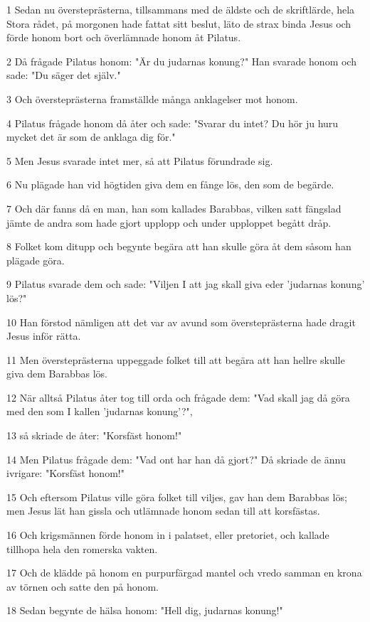 \par 1 Sedan nu översteprästerna, tillsammans med de äldste och de skriftlärde, hela Stora rådet, på morgonen hade fattat sitt beslut, läto de strax binda Jesus och förde honom bort och överlämnade honom åt Pilatus.
\par 2 Då frågade Pilatus honom: "Är du judarnas konung?" Han svarade honom och sade: "Du säger det själv."
\par 3 Och översteprästerna framställde många anklagelser mot honom.
\par 4 Pilatus frågade honom då åter och sade: "Svarar du intet? Du hör ju huru mycket det är som de anklaga dig för."
\par 5 Men Jesus svarade intet mer, så att Pilatus förundrade sig.
\par 6 Nu plägade han vid högtiden giva dem en fånge lös, den som de begärde.
\par 7 Och där fanns då en man, han som kallades Barabbas, vilken satt fängslad jämte de andra som hade gjort upplopp och under upploppet begått dråp.
\par 8 Folket kom ditupp och begynte begära att han skulle göra åt dem såsom han plägade göra.
\par 9 Pilatus svarade dem och sade: "Viljen I att jag skall giva eder 'judarnas konung' lös?"
\par 10 Han förstod nämligen att det var av avund som översteprästerna hade dragit Jesus inför rätta.
\par 11 Men översteprästerna uppeggade folket till att begära att han hellre skulle giva dem Barabbas lös.
\par 12 När alltså Pilatus åter tog till orda och frågade dem: "Vad skall jag då göra med den som I kallen 'judarnas konung'?",
\par 13 så skriade de åter: "Korsfäst honom!"
\par 14 Men Pilatus frågade dem: "Vad ont har han då gjort?" Då skriade de ännu ivrigare: "Korsfäst honom!"
\par 15 Och eftersom Pilatus ville göra folket till viljes, gav han dem Barabbas lös; men Jesus lät han gissla och utlämnade honom sedan till att korsfästas.
\par 16 Och krigsmännen förde honom in i palatset, eller pretoriet, och kallade tillhopa hela den romerska vakten.
\par 17 Och de klädde på honom en purpurfärgad mantel och vredo samman en krona av törnen och satte den på honom.
\par 18 Sedan begynte de hälsa honom: "Hell dig, judarnas konung!"
